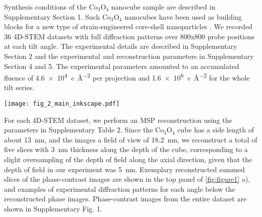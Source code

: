 \documentclass[12pt]{iopart}
\begin{document}
 Synthesis conditions of the $\mathrm{Co_{3}O_{4}}$ nanocube sample are described in Supplementary Section 1. Such $\mathrm{Co_{3}O_{4}}$ nanocubes have been used as building blocks for a new type of strain-engineered core-shell nanoparticles \cite{oh2020design}. We recorded 36 4D-STEM datasets \cite{ophus2019four} with full diffraction patterns over \num{800}x\num{800} probe positions at each tilt angle. The experimental details are described in Supplementary Section 2 and the experimental and reconstruction parameters in Supplementary Section 4 and 5. The experimental parameters amounted to an accumulated fluence of \SI{4.6e4}{\elementarycharge\per\angstrom^2} per projection and \SI{1.6e6}{\elementarycharge\per\angstrom^2} for the whole tilt series. 
\begin{figure*}[ht!]
\texttt{[image: fig\_2\_main\_inkscape.pdf]}
\caption{\label{fig:figure2} Exemplary ptychographic reconstruction a) before and b) after denoising. c) Reconstructed volume, oriented along the $\mathrm{[11\bar{2}]}$ direction. d) reconstructed volume viewed along the [228] direction.}
\end{figure*}
For each 4D-STEM dataset, we perform an MSP reconstruction \cite{sha2022deep} using the parameters in Supplementary Table 2.  Since the $\mathrm{Co_{3}O_{4}}$ cube has a side length of about \SI{13}{\nano\meter}, and the images a field of view of \SI{18.2}{\nano\meter}, we reconstruct a total of five slices with \SI{3}{\nano\meter} thickness along the depth of the cube, corresponding to a slight oversampling of the depth of field along the axial direction, given that the depth of field in our experiment was \SI{5}{\nano\meter}. Exemplary reconstructed summed slices of the phase-contrast images are shown in the top panel of \ref{fig:figure1} a), and examples of experimental diffraction patterns for each angle below the reconstructed phase images. Phase-contrast images from the entire dataset are shown in Supplementary Fig. 1.
\end{document}
